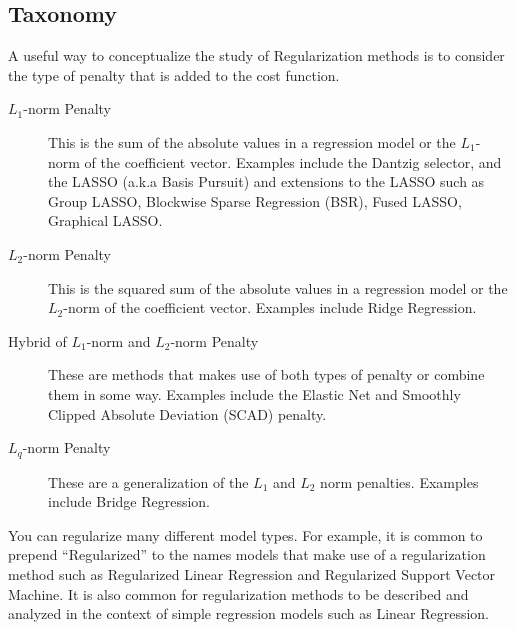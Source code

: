 \begin{bibunit}
\subsection{Taxonomy}
A useful way to conceptualize the study of Regularization methods is to consider the type of penalty that is added to the cost function.

\begin{description}
	\item[$L_1$-norm Penalty] This is the sum of the absolute values in a regression model or the $L_1$-norm of the coefficient vector. Examples include the Dantzig selector, and the LASSO (a.k.a Basis Pursuit) and extensions to the LASSO such as Group LASSO, Blockwise Sparse Regression (BSR), Fused LASSO, Graphical LASSO.
	\item[$L_2$-norm Penalty] This is the squared sum of the absolute values in a regression model or the $L_2$-norm of the coefficient vector. Examples include Ridge Regression.
	\item[Hybrid of $L_1$-norm and $L_2$-norm Penalty] These are methods that makes use of both types of penalty or combine them in some way. Examples include the Elastic Net and Smoothly Clipped Absolute Deviation (SCAD) penalty.
	\item[$L_q$-norm Penalty] These are a generalization of the $L_1$ and $L_2$ norm penalties. Examples include Bridge Regression.
\end{description}


You can regularize many different model types. For example, it is common to prepend ``Regularized'' to the names models that make use of a regularization method such as Regularized Linear Regression and Regularized Support Vector Machine. It is also common for regularization methods to be described and analyzed in the context of simple regression models such as Linear Regression.


\putbib
\end{bibunit}

\newpage\begin{bibunit}\putbib\end{bibunit}
\newpage\begin{bibunit}\putbib\end{bibunit}
\newpage\begin{bibunit}\putbib\end{bibunit}
